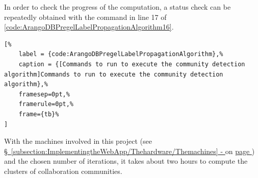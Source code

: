 \begin{sublstlisting}
	\noindent\begin{minipage}{\linewidth}%
    	\noindent%
	\end{minipage}%
	
	In order to check the progress of the computation, a status check can be repeatedly obtained with the command in line 17 of \hyperref[code:ArangoDBPregelLabelPropagationAlgorithm16]{\autoref{code:ArangoDBPregelLabelPropagationAlgorithm16}}.
	
	\noindent\begin{minipage}{\linewidth}%
	\end{minipage}%
\end{sublstlisting}%
%
\vspace*{-5.7pt}%
\begin{lstlisting}[%
	label = {code:ArangoDBPregelLabelPropagationAlgorithm},%
	caption = {[Commands to run to execute the community detection algorithm]Commands to run to execute the community detection algorithm},%
	framesep=0pt,%
	framerule=0pt,%
	frame={tb}%
]
\end{lstlisting}

With the machines involved in this project (see \hyperref[subsection:ImplementingtheWebApp/Thehardware/Themachines]{\S\ \ref{subsection:ImplementingtheWebApp/Thehardware/Themachines} - } on \hyperref[subsection:ImplementingtheWebApp/Thehardware/Themachines]{page \pageref*{subsection:ImplementingtheWebApp/Thehardware/Themachines}}) and the chosen number of iterations, it takes about two hours to compute the clusters of collaboration communities.

